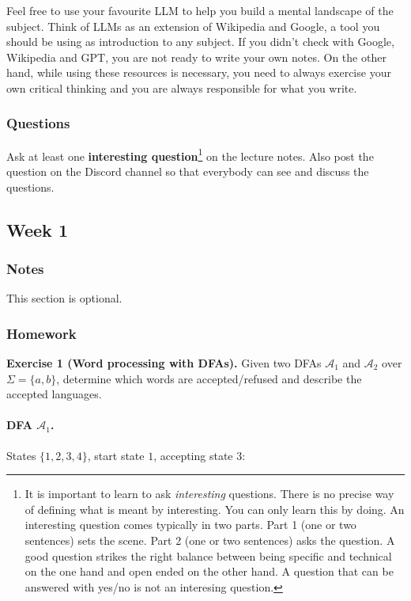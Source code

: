 \documentclass{article}
\theoremstyle{theorem}
\theoremstyle{definition}
\theoremstyle{remark}
\begin{document}
Feel free to use your favourite LLM to help you build a mental landscape of the subject. Think of LLMs as an extension of Wikipedia and Google, a tool you should be using as introduction to any subject. If you didn't check with Google, Wikipedia and GPT, you are not ready to write your own notes. On the other hand, while using these resources is necessary, you need to always exercise your own critical thinking and you are always responsible for what you write. 


\subsubsection{Questions}

Ask at least one \textbf{interesting question}\footnote{It is important to learn to ask \emph{interesting} questions. There is no precise way of defining what is meant by interesting. You can only learn this by doing. An interesting question comes typically in two parts. Part 1 (one or two sentences) sets the scene. Part 2 (one or two sentences) asks the question. A good question strikes the right balance between being specific and technical on the one hand and open ended on the other hand. A question that can be answered with yes/no is not an interesing question.} on the lecture notes. Also post the question on the Discord channel so that everybody can see and discuss the questions.

\clearpage
\subsection{Week 1}

\subsubsection{Notes}

This section is optional. 

\subsubsection{Homework}

\textbf{Exercise 1 (Word processing with DFAs).}
Given two DFAs $\mathcal{A}_1$ and $\mathcal{A}_2$ over $\Sigma = \{a, b\}$, determine which words are accepted/refused and describe the accepted languages.

\paragraph{DFA $\mathcal{A}_1$.} States $\{1, 2, 3, 4\}$, start state $1$, accepting state $3$:
\end{document}
